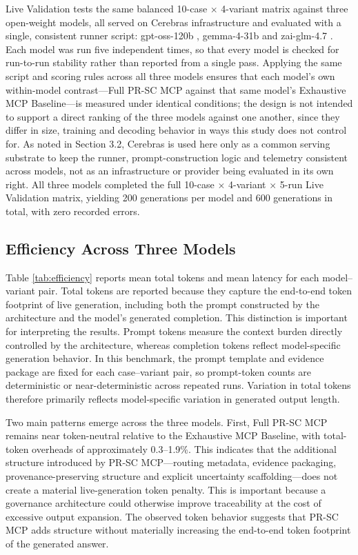 Live Validation tests the same balanced 10-case $\times$ 4-variant matrix against three open-weight models, all served on Cerebras infrastructure and evaluated with a single, consistent runner script: gpt-oss-120b \cite{OpenAI2025}, gemma-4-31b \cite{Cerebras2026a} and zai-glm-4.7 \cite{Cerebras2026b, Zai2025}. Each model was run five independent times, so that every model is checked for run-to-run stability rather than reported from a single pass. Applying the same script and scoring rules across all three models ensures that each model's own within-model contrast---Full PR-SC MCP against that same model's Exhaustive MCP Baseline---is measured under identical conditions; the design is not intended to support a direct ranking of the three models against one another, since they differ in size, training and decoding behavior in ways this study does not control for. As noted in Section 3.2, Cerebras is used here only as a common serving substrate to keep the runner, prompt-construction logic and telemetry consistent across models, not as an infrastructure or provider being evaluated in its own right. All three models completed the full 10-case $\times$ 4-variant $\times$ 5-run Live Validation matrix, yielding 200 generations per model and 600 generations in total, with zero recorded errors.

\subsection{Efficiency Across Three Models}

Table \ref{tab:efficiency} reports mean total tokens and mean latency for each model--variant pair. Total tokens are reported because they capture the end-to-end token footprint of live generation, including both the prompt constructed by the architecture and the model's generated completion. This distinction is important for interpreting the results. Prompt tokens measure the context burden directly controlled by the architecture, whereas completion tokens reflect model-specific generation behavior. In this benchmark, the prompt template and evidence package are fixed for each case--variant pair, so prompt-token counts are deterministic or near-deterministic across repeated runs. Variation in total tokens therefore primarily reflects model-specific variation in generated output length.

Two main patterns emerge across the three models. First, Full PR-SC MCP remains near token-neutral relative to the Exhaustive MCP Baseline, with total-token overheads of approximately 0.3--1.9\%. This indicates that the additional structure introduced by PR-SC MCP---routing metadata, evidence packaging, provenance-preserving structure and explicit uncertainty scaffolding---does not create a material live-generation token penalty. This is important because a governance architecture could otherwise improve traceability at the cost of excessive output expansion. The observed token behavior suggests that PR-SC MCP adds structure without materially increasing the end-to-end token footprint of the generated answer.

